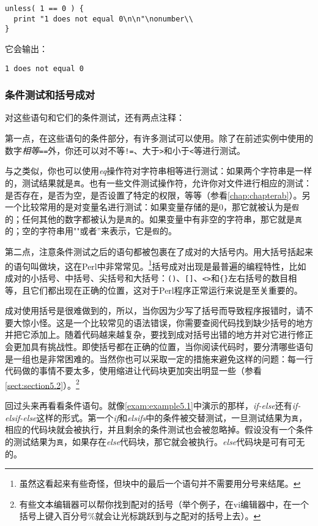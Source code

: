 \begin{lstlisting}
unless( 1 == 0 ) {
  print "1 does not equal 0\n\n"\nonumber\\
}
\end{lstlisting}

它会输出：

\begin{lstlisting}
1 does not equal 0
\end{lstlisting}

\subsubsection{条件测试和括号成对}
对这些语句和它们的条件测试，还有两点注释：

第一点，在这些语句的条件部分，有许多测试可以使用。除了在前述实例中使用的数字\textit{相等}\verb|==|外，你还可以对不等\verb|!=|、大于\verb|>|和小于\verb|<|等进行测试。

与之类似，你也可以使用\textit{eq}操作符对字符串相等进行测试：如果两个字符串是一样的，测试结果就是\verb|真|。也有一些文件测试操作符，允许你对文件进行相应的测试：是否存在，是否为空，是否设置了特定的权限，等等（参看\autoref{chap:chapterab}）。另一个比较常用的是对变量名进行测试：如果变量存储的是0，那它就被认为是\verb|假|的；任何其他的数字都被认为是\verb|真|的。如果变量中有非空的字符串，那它就是\verb|真|的；空的字符串用""或者''来表示，它是\verb|假|的。

第二点，注意条件测试之后的语句都被包裹在了成对的大括号内。用大括号括起来的语句叫做块，这在Perl中非常常见。\footnote{虽然这看起来有些奇怪，但块中的最后一个语句并不需要用分号来结尾。}括号成对出现是最普遍的编程特性，比如成对的小括号、中括号、尖括号和大括号：\verb|()|、\verb|[]|、\verb|<>|和\verb|{}|左右括号的数目相等，且它们都出现在正确的位置，这对于Perl程序正常运行来说是至关重要的。

成对使用括号是很难做到的，所以，当你因为少写了括号而导致程序报错时，请不要大惊小怪。这是一个比较常见的语法错误，你需要查阅代码找到缺少括号的地方并把它添加上。随着代码越来越复杂，要找到成对括号出错的地方并对它进行修正会更加具有挑战性。即使括号都在正确的位置，当你阅读代码时，要分清哪些语句是一组也是非常困难的。当然你也可以采取一定的措施来避免这样的问题：每一行代码做的事情不要太多，使用缩进让代码块更加突出明显一些（参看\autoref{sect:section5.2}）。\footnote{有些文本编辑器可以帮你找到配对的括号（举个例子，在vi编辑器中，在一个括号上键入百分号\%就会让光标跳跃到与之配对的括号上去）。} 

回过头来再看看条件语句。就像\autoref{exam:example5.1}中演示的那样，\textit{if-else}还有\textit{if-elsif-else}这样的形式。第一个\textit{if}和\textit{elsifs}中的条件被交替测试，一旦测试结果为\verb|真|，相应的代码块就会被执行，并且剩余的条件测试也会被忽略掉。假设没有一个条件的测试结果为\verb|真|，如果存在\textit{else}代码块，那它就会被执行。\textit{else}代码块是可有可无的。

